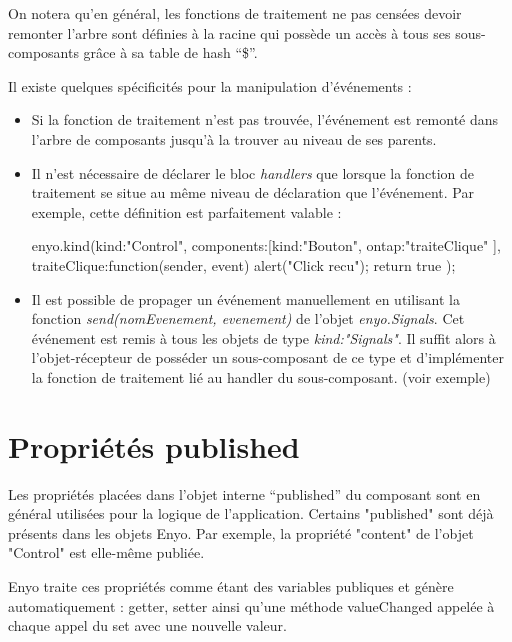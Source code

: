\documentclass[11pt,a4paper]{report}
\begin{document}
On notera qu'en général, les fonctions de traitement ne pas censées devoir remonter l'arbre
sont définies à la racine qui possède un accès à tous ses sous-composants 
grâce à sa table de hash ``\$''.

Il existe quelques spécificités pour la manipulation d'événements :
\begin{itemize}
\item Si la fonction de traitement n'est pas trouvée, l'événement est remonté dans l'arbre de 
  composants jusqu'à la trouver au niveau de ses parents.
\item Il n'est nécessaire de déclarer le bloc \emph{handlers} que lorsque la fonction de traitement
  se situe au même niveau de déclaration que l'événement. Par exemple, cette définition est parfaitement valable :
  \begin{JavaScript}
    enyo.kind({kind:"Control", 
               components:[{kind:"Bouton", 
                            ontap:"traiteClique"}
                          ],
               traiteClique:function(sender, event){
                 alert("Click recu"); return true
               }
    });
  \end{JavaScript}
\item Il est possible de propager un événement manuellement en utilisant la fonction 
  \emph{send(nomEvenement, evenement)} de l'objet \emph{enyo.Signals}. 
  Cet événement est remis à tous les objets de type \emph{kind:"Signals"}. Il suffit alors
  à l'objet-récepteur de posséder un sous-composant de ce type et d'implémenter la fonction de 
  traitement lié au handler du sous-composant. (voir exemple)
\end{itemize}

\section{Propriétés published}\label{sec:published}
Les propriétés placées dans l'objet interne ``published'' du composant sont en général utilisées pour
la logique de l'application. Certains "published" sont déjà présents dans les objets Enyo. 
Par exemple, la propriété "content" de l'objet "Control" est elle-même publiée.

Enyo traite ces propriétés comme étant des variables publiques et génère automatiquement : 
getter, setter ainsi qu'une méthode valueChanged appelée à chaque appel du set avec une nouvelle valeur.
\\\medskip
\end{document}
